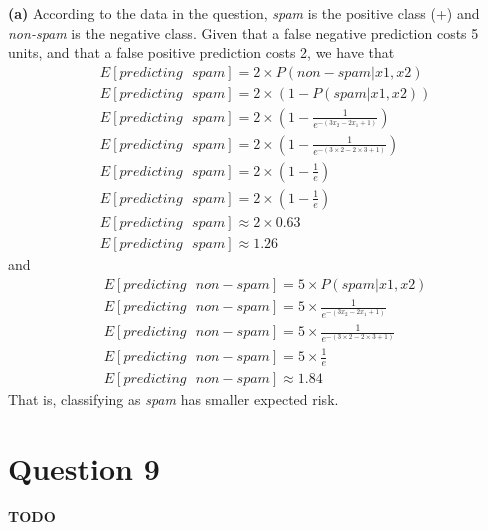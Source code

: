 \documentclass[leqno]{article}
\begin{document}
\noindent \textbf{(a)} According to the data in the question, \textit{spam} is the positive class (+) and \textit{non-spam} is the negative class. Given that a false negative 
prediction costs 5 units, and that a false positive prediction costs 2, we have that
\begin{equation*}
\begin{split}
&E[predicting\mbox{ }spam] = 2 \times P(non-spam|x1, x2)\\
&E[predicting\mbox{ }spam] = 2 \times (1 - P(spam|x1, x2))\\
&E[predicting\mbox{ }spam] = 2 \times (1 - \frac{1}{e^{-(3x_2 - 2x_1 + 1)}})\\
&E[predicting\mbox{ }spam] = 2 \times (1 - \frac{1}{e^{-(3 \times 2 - 2 \times 3 + 1)}})\\
&E[predicting\mbox{ }spam] = 2 \times (1 - \frac{1}{e})\\
&E[predicting\mbox{ }spam] = 2 \times (1 - \frac{1}{e})\\
&E[predicting\mbox{ }spam] \approx 2 \times 0.63\\
&E[predicting\mbox{ }spam] \approx 1.26
\end{split}
\end{equation*} 
and
\begin{equation*}
\begin{split}
&E[predicting\mbox{ }non-spam] = 5 \times P(spam|x1, x2)\\
&E[predicting\mbox{ }non-spam] = 5 \times \frac{1}{e^{-(3x_2 - 2x_1 + 1)}}\\
&E[predicting\mbox{ }non-spam] = 5 \times \frac{1}{e^{-(3 \times 2 - 2 \times 3 + 1)}}\\
&E[predicting\mbox{ }non-spam] = 5 \times \frac{1}{e}\\
&E[predicting\mbox{ }non-spam] \approx 1.84
\end{split}
\end{equation*} 
That is, classifying as \textit{spam} has smaller expected risk.

\section*{Question 9} \textbf{TODO}
\end{document}
